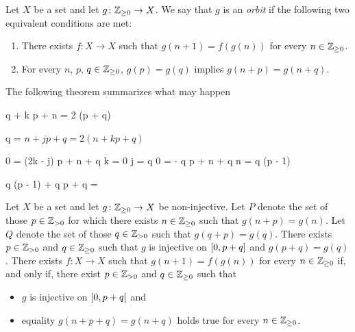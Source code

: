 Let $X$ be a set and let $g\colon\mathbb{Z}_{\ge 0} \to X$.
We say that $g$ is an \emph{orbit} if the following two equivalent conditions are met:
\begin{enumerate}
\item There exists $f \colon X \to X$  such that $g(n + 1) = f(g(n))$ for every $n \in \mathbb{Z}_{\ge 0}$.
\item For every $n$, $p$, $q \in \mathbb{Z}_{\ge 0}$, $g(p) = g(q)$ implies $g(n + p) = g(n + q)$.
\end{enumerate}
The following theorem summarizes what may happen


q + k p + n  = 2 (p + q)

q = 
$n + jp + q = 2(n + k p + q)$

0 = (2k - j) p + n + q
k = 0
j = q
0 = - q p + n + q
n = q (p - 1)

q (p - 1) + q p + q = 
\begin{theorem} \label{thm:eventually-periodic}
  Let $X$ be a set and let $g\colon \mathbb{Z}_{\ge 0} \to X$ be non-injective.
  Let $P$ denote the set of those $p \in \mathbb{Z}_{> 0}$ for which there exists $n \in \mathbb{Z}_{\ge 0}$ such that $g(n + p) = g(n)$.
  Let $Q$ denote the set of those $q \in \mathbb{Z}_{> 0}$ such that $g(q + p) = g(q)$.
  There exists $p \in \mathbb{Z}_{> 0}$ and $q \in \mathbb{Z}_{\ge 0}$ such that $g$ is injective on $\left[ 0, p + q \right]$ and $g(p + q) = g(q)$.
    There exists $f\colon X \to X$ such that $g(n + 1) = f(g(n))$ for every $n \in \mathbb{Z}_{\ge 0}$ if, and only if,
  there exist $p \in \mathbb{Z}_{> 0}$ and $q \in \mathbb{Z}_{\ge 0}$ such that
  \begin{itemize}
    \item 
      $g$ is injective on $\left[ 0, p + q \right[$ and
     \item 
       equality $g(n + p + q) = g(n + q)$ holds true for every $n \in \mathbb{Z}_{\ge 0}$.
   \end{itemize}
\end{theorem}

